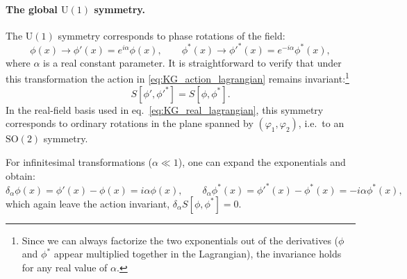 \paragraph{The global \(\mathrm{U}(1)\) symmetry.}
The \(\mathrm{U}(1)\) symmetry corresponds to phase rotations of the field:
\begin{equation}
    \phi(x) \rightarrow \phi'(x) = e^{i\alpha} \phi(x),
    \qquad
    \phi^{\ast}(x) \rightarrow \phi'^{\ast}(x) = e^{-i\alpha} \phi^{\ast}(x),
    \label{eq:U1_symmetry}
\end{equation}
where \(\alpha\) is a real constant parameter.
It is straightforward to verify that under this transformation the action in \eqref{eq:KG_action_lagrangian} remains invariant:\footnote{Since we can always factorize the two exponentials out of the derivatives (\(\phi\) and \(\phi^{\ast}\) appear multiplied together in the Lagrangian), the invariance holds for any real value of \(\alpha\).}
\[
    S[\phi', \phi'^{\ast}] = S[\phi, \phi^{\ast}].
\]
In the real-field basis used in eq.~\eqref{eq:KG_real_lagrangian}, this symmetry corresponds to ordinary rotations in the plane spanned by \((\varphi_1, \varphi_2)\), i.e.\ to an \(\mathrm{SO}(2)\) symmetry.

For infinitesimal transformations (\(\alpha \ll 1\)), one can expand the exponentials and obtain:
\begin{equation}
    \delta_{\alpha}\phi(x) = \phi'(x) - \phi(x) = i\alpha \phi(x),
    \qquad
    \delta_{\alpha}\phi^{\ast}(x) = \phi'^{\ast}(x) - \phi^{\ast}(x) = -i\alpha \phi^{\ast}(x),
    \label{eq:U1_infinitesimal_transformations}
\end{equation}
which again leave the action invariant, \(\delta_{\alpha}S[\phi, \phi^{\ast}] = 0\).

